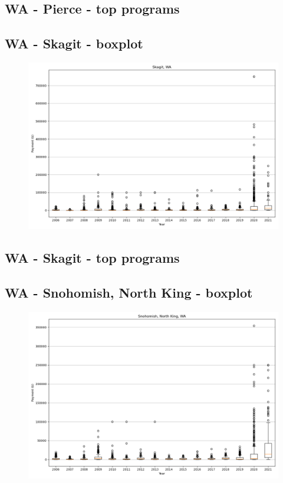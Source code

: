 \subsection*{WA - Pierce - top programs}

\newpage
\subsection*{WA - Skagit - boxplot}
\begin{figure}[h]
\centering
\includegraphics[width=7in]{../output/boxplots/counties/Skagit-WA_boxplot.png}
\end{figure}


\subsection*{WA - Skagit - top programs}

\newpage
\subsection*{WA - Snohomish, North King - boxplot}
\begin{figure}[h]
\centering
\includegraphics[width=7in]{../output/boxplots/counties/Snohomish, North King-WA_boxplot.png}
\end{figure}


